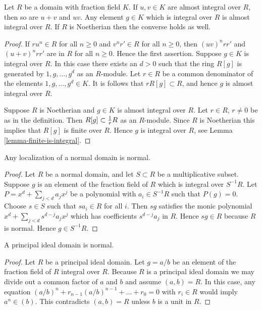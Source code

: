 \begin{lemma}
\label{lemma-almost-integral}
Let $R$ be a domain with fraction field $K$.
If $u,v \in K$ are almost integral over $R$, then so are
$u+v$ and $uv$. Any element $g \in K$ which is integral over $R$
is almost integral over $R$. If $R$ is Noetherian
then the converse holds as well.
\end{lemma}

\begin{proof}
If $ru^n \in R$ for all $n \geq 0$ and 
$v^nr' \in R$ for all $n \geq 0$, then
$(uv)^nrr'$ and $(u+v)^nrr'$ are in $R$ for
all $n \geq 0$. Hence the first assertion.
Suppose $g \in K$ is integral over $R$.
In this case there exists an $d > 0$ such that
the ring $R[g]$ is generated by $1,g,\ldots,g^d$ as an $R$-module.
Let $r \in R$ be a common denominator of the elements
$1,g,\ldots,g^d \in K$. It is follows that $rR[g] \subset R$,
and hence $g$ is almost integral over $R$.

\medskip\noindent
Suppose $R$ is Noetherian and $g \in K$ is almost integral over $R$.
Let $r \in R$, $r\not= 0$ be as in the definition. 
Then $R[g] \subset {1 \over r}R$ as an $R$-module.
Since $R$ is Noetherian this implies that $R[g]$ is
finite over $R$. Hence $g$ is integral over $R$, see
Lemma \ref{lemma-finite-is-integral}.
\end{proof}

\begin{lemma}
\label{lemma-localize-normal-domain}
Any localization of a normal domain is normal.
\end{lemma}

\begin{proof}
Let $R$ be a normal domain, and let $S \subset R$ be
a multiplicative subset. Suppose $g$ is an element
of the fraction field of $R$ which is integral over $S^{-1}R$.
Let $P = x^d + \sum_{j < d} a_j x^j$ be a polynomial
with $a_i \in S^{-1}R$ such that $P(g) = 0$.
Choose $s \in S$ such that $sa_i \in R$ for all $i$. 
Then $sg$ satisfies the monic polynomial
$x^d + \sum_{j < d} s^{d-j}a_j x^j$ which has coefficients
$s^{d-j}a_j$ in $R$. Hence $sg \in R$ because $R$ is normal.
Hence $g \in S^{-1}R$.
\end{proof}

\begin{lemma}
\label{lemma-PID-normal}
A principal ideal domain is normal.
\end{lemma}

\begin{proof}
Let $R$ be a principal ideal domain.
Let $g = a/b$ be an element of the fraction field
of $R$ integral over $R$. Because $R$ is a principal ideal domain
we may divide out a common factor of $a$ and $b$
and assume $(a,b) = R$. In this case, any equation
$(a/b)^n + r_{n-1} (a/b)^{n-1} + \ldots + r_0 = 0$
with $r_i \in R$ would imply $a^n \in (b)$. This
contradicts $(a,b) = R$ unless $b$ is a unit in $R$.
\end{proof}


